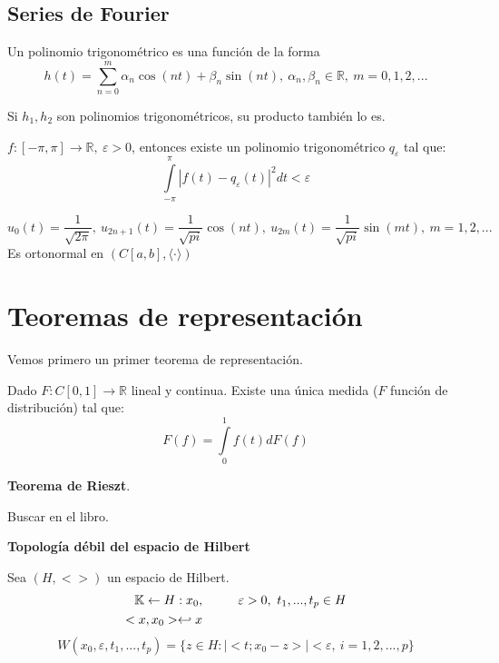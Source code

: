 \documentclass[openany]{book}
\begin{document}
\subsection{Series de Fourier}

\begin{definition}
    Un polinomio trigonométrico es una función de la forma
    $$ h(t) = \sum\limits_{n=0}^{m} \alpha_n \cos(nt)+\beta_n \sin(nt),\ \alpha_n,\beta_n \in \mathbb{R},\ m = 0,1,2,... $$

\end{definition}

\begin{lemma}
    Si $ h_1,h_2 $ son polinomios trigonométricos, su producto también lo es.
\end{lemma}

\begin{lemma}
    $ f: [- \pi, \pi] \to \mathbb{R},\ \varepsilon>0 $, entonces existe un polinomio trigonométrico $ q_{\varepsilon} $ tal que:
    $$ \int\limits_{-\pi}^{\pi}|f(t)-q_{\varepsilon}(t)|^2 dt < \varepsilon $$
\end{lemma}

\begin{exercise}
    $$ u_0(t) = \dfrac{1}{\sqrt{2\pi}},\ u_{2n+1}(t) = \dfrac{1}{\sqrt{pi}} \cos(nt),\ u_{2m}(t) = \dfrac{1}{\sqrt{pi}} \sin(mt),\ m = 1,2,... $$
    Es ortonormal en $ (C[a,b],\langle\cdot \rangle) $
\end{exercise}


\section{Teoremas de representación}

Vemos primero un primer teorema de representación.

\begin{proposition}
    Dado $ F:C[0,1]\to \mathbb{R} $  lineal y continua. Existe una única medida ($ F $ función de distribución) tal que:
    $$ F(f) = \int\limits_{0}^{1}f(t)dF(f) $$
\end{proposition}



\begin{theorem}
    \textbf{Teorema de Rieszt}.

    Buscar en el libro.
\end{theorem}


\begin{definition}\textbf{Topología débil del espacio de Hilbert}

    Sea $ (H,<>) $ un espacio de Hilbert. 
    $$ 
    \begin{aligned}
        \mathbb{K} \leftarrow H : x_0, & \hspace{10mm} \varepsilon>0,\  t_1,...,t_p \in H\\ <x,x_0> \hookleftarrow x
    \end{aligned}
    $$
    $$ W(x_0,\varepsilon,t_1,...,t_p) = \{z \in H: |<t;x_0-z>|< \varepsilon,\ i=1,2,...,p\} $$
\end{definition}
\end{document}
